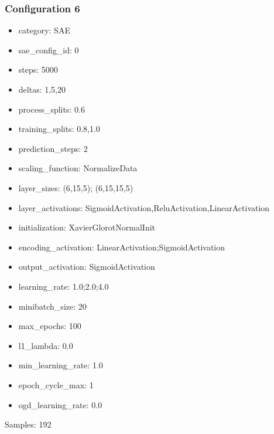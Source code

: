 \documentclass[a4paper,11pt,oneside]{article}
\theoremstyle{plain}
\theoremstyle{definition}
\begin{document}
\subsubsection{Configuration 6}\label{config6}
\begin{itemize}
	\item category: SAE
	\item sae\_config\_id: 0
	\item steps: 5000
	\item deltas: 1,5,20
	\item process\_splits: 0.6
	\item training\_splits: 0.8,1.0
	\item prediction\_steps: 2
	\item scaling\_function: NormalizeData
	\item layer\_sizes: (6,15,5); (6,15,15,5)
	\item layer\_activations: SigmoidActivation,ReluActivation,LinearActivation
	\item initialization: XavierGlorotNormalInit
	\item encoding\_activation: LinearActivation;SigmoidActivation
	\item output\_activation: SigmoidActivation
	\item learning\_rate: 1.0;2.0;4.0
	\item minibatch\_size: 20
	\item max\_epochs: 100
	\item l1\_lambda: 0.0
	\item min\_learning\_rate: 1.0
	\item epoch\_cycle\_max: 1
	\item ogd\_learning\_rate: 0.0
\end{itemize}

Samples: 192
\end{document}
